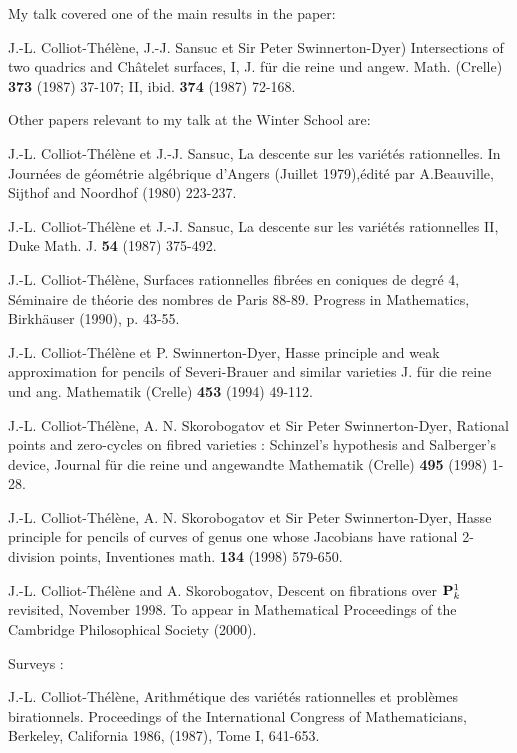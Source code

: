 My talk covered one of the main results
in the paper:

J.-L. Colliot-Th\'el\`ene, J.-J. Sansuc et Sir Peter
Swinnerton-Dyer) Intersections of two quadrics and Ch\^atelet surfaces,
I, J. f\"ur die reine und angew. Math. (Crelle) {\bf 373} (1987) 37-107;
II, ibid. {\bf 374} (1987) 72-168.



 Other papers relevant to my talk at
the Winter School are:

 J.-L. Colliot-Th\'el\`ene et J.-J. Sansuc,  La descente sur les
vari\'et\'es rationnelles.  In Journ\'ees de g\'eom\'etrie alg\'ebrique
d'Angers (Juillet 1979),\'edit\'e par  A.Beauville, Sijthof and Noordhof
(1980) 223-237.


 J.-L. Colliot-Th\'el\`ene et J.-J. Sansuc, La descente sur les
vari\'et\'es rationnelles II,  Duke Math. J. {\bf 54} (1987) 375-492.


  J.-L. Colliot-Th\'el\`ene, Surfaces rationnelles fibr\'ees en
coniques de degr\'e 4,  S\'eminaire de  th\'eorie des nombres de Paris
88-89. Progress in Mathematics, Birkh\"auser (1990), p. 43-55.

 J.-L. Colliot-Th\'el\`ene et P. Swinnerton-Dyer, Hasse principle and
weak approximation for pencils of Severi-Brauer and similar varieties
J. f\"ur die reine und  ang. Mathematik (Crelle) {\bf 453} (1994) 49-112.

  J.-L. Colliot-Th\'el\`ene, A. N. Skorobogatov et Sir Peter
Swinnerton-Dyer,  Rational points and zero-cycles on fibred varieties :
Schinzel's hypothesis and Salberger's device,
 Journal f\"ur die reine und angewandte
Mathematik (Crelle) {\bf 495}  (1998) 1-28.

 J.-L. Colliot-Th\'el\`ene, A. N. Skorobogatov et Sir Peter
Swinnerton-Dyer,  Hasse principle  for pencils of curves of genus one
whose Jacobians have rational 2-division points,
Inventiones math. {\bf 134} (1998) 579-650.

 J.-L. Colliot-Th\'el\`ene and  A. Skorobogatov,
Descent on fibrations over ${\bf P}^1_k$ revisited, November 1998.
To appear in Mathematical Proceedings
of the Cambridge Philosophical Society (2000).




Surveys :

 J.-L. Colliot-Th\'el\`ene, Arithm\'etique des vari\'et\'es
rationnelles et probl\`emes birationnels.  Proceedings of the
International Congress of Mathematicians, Berkeley,  California 1986,
(1987), Tome I, 641-653.

